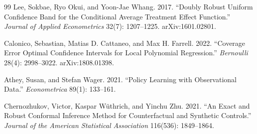 \documentclass{article}
\begin{document}
\begin{thebibliography}{99}
   Lee, Sokbae, Ryo Okui, and Yoon-Jae Whang. 2017. ``Doubly Robust Uniform Confidence Band for the Conditional Average Treatment Effect Function.'' \emph{Journal of Applied Econometrics} 32(7): 1207--1225. arXiv:1601.02801.

   Calonico, Sebastian, Matias D. Cattaneo, and Max H. Farrell. 2022. ``Coverage Error Optimal Confidence Intervals for Local Polynomial Regression.'' \emph{Bernoulli} 28(4): 2998--3022. arXiv:1808.01398.

   Athey, Susan, and Stefan Wager. 2021. ``Policy Learning with Observational Data.'' \emph{Econometrica} 89(1): 133--161.

   Chernozhukov, Victor, Kaspar W\"uthrich, and Yinchu Zhu. 2021. ``An Exact and Robust Conformal Inference Method for Counterfactual and Synthetic Controls.'' \emph{Journal of the American Statistical Association} 116(536): 1849--1864.

\end{thebibliography}
\end{document}
